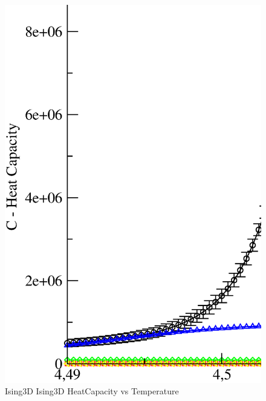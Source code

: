 \begin{figure}[!htpb]
  \centering
  \includegraphics[width=\textwidth]{./plots/Ising3D/Ising3D_HeatCapacity_vs_Temperature.eps}
  \caption{Ising3D Ising3D HeatCapacity vs Temperature}
\end{figure}

